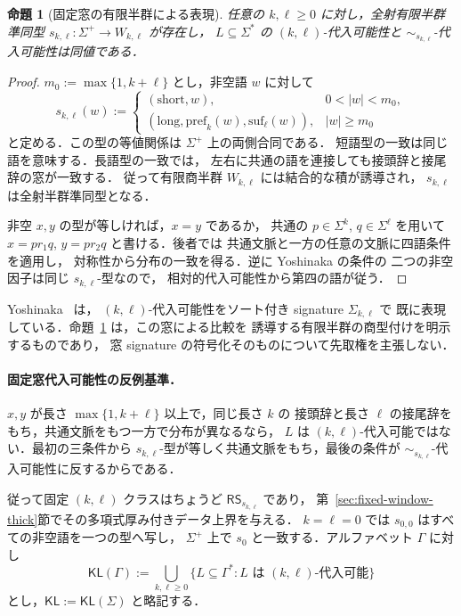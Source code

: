 \documentclass[11pt,a4paper]{ltjsarticle}
\newtheorem{proposition}[theorem]{命題}
\theoremstyle{remark}
\theoremstyle{plain}
\newcommand{\pref}{\mathrm{pref}}
\newcommand{\suf}{\mathrm{suf}}
\begin{document}
\begin{proposition}[固定窓の有限半群による表現]
\label{prop:yl-special}
任意の $k,\ell\ge0$ に対し，全射有限半群準同型
$s_{k,\ell}:\Sigma^+\to W_{k,\ell}$ が存在し，
$L\subseteq\Sigma^*$ の $(k,\ell)$-代入可能性と
$\sim_{s_{k,\ell}}$-代入可能性は同値である．
\end{proposition}
\begin{proof}
$m_0:=\max\{1,k+\ell\}$ とし，非空語 $w$ に対して
\[
s_{k,\ell}(w):=
\begin{cases}
(\mathrm{short},w),&0<|w|<m_0,\\
(\mathrm{long},\pref_k(w),\suf_\ell(w)),&|w|\ge m_0
\end{cases}
\]
と定める．この型の等値関係は $\Sigma^+$ 上の両側合同である．
短語型の一致は同じ語を意味する．長語型の一致では，
左右に共通の語を連接しても接頭辞と接尾辞の窓が一致する．
従って有限商半群 $W_{k,\ell}$ には結合的な積が誘導され，
$s_{k,\ell}$ は全射半群準同型となる．

非空 $x,y$ の型が等しければ，$x=y$ であるか，
共通の $p\in\Sigma^k$, $q\in\Sigma^\ell$ を用いて
$x=pr_1q$, $y=pr_2q$ と書ける．後者では
共通文脈と一方の任意の文脈に四語条件を適用し，
対称性から分布の一致を得る．逆に Yoshinaka の条件の
二つの非空因子は同じ $s_{k,\ell}$-型なので，
相対的代入可能性から第四の語が従う．
\end{proof}

Yoshinaka~\cite[Example~4]{yoshinaka2015} は，
$(k,\ell)$-代入可能性をソート付き signature $\Sigma_{k,\ell}$ で
既に表現している．命題~\ref{prop:yl-special} は，この窓による比較を
誘導する有限半群の商型付けを明示するものであり，
窓 signature の符号化そのものについて先取権を主張しない．

\label{crit:kl}
\paragraph{固定窓代入可能性の反例基準．}
$x,y$ が長さ $\max\{1,k+\ell\}$ 以上で，同じ長さ $k$ の
接頭辞と長さ $\ell$ の接尾辞をもち，共通文脈をもつ一方で分布が異なるなら，
$L$ は $(k,\ell)$-代入可能ではない．最初の三条件から
$s_{k,\ell}$-型が等しく共通文脈をもち，最後の条件が
$\sim_{s_{k,\ell}}$-代入可能性に反するからである．

従って固定 $(k,\ell)$ クラスはちょうど $\mathsf{RS}_{s_{k,\ell}}$ であり，
第~\ref{sec:fixed-window-thick}節でその多項式厚み付きデータ上界を与える．
$k=\ell=0$ では $s_{0,0}$ はすべての非空語を一つの型へ写し，
$\Sigma^+$ 上で $s_0$ と一致する．アルファベット $\Gamma$ に対し
\[
\mathsf{KL}(\Gamma):=
\bigcup_{k,\ell\ge0}
\{L\subseteq\Gamma^*:L\text{ は $(k,\ell)$-代入可能}\}
\]
とし，$\mathsf{KL}:=\mathsf{KL}(\Sigma)$ と略記する．
\end{document}
